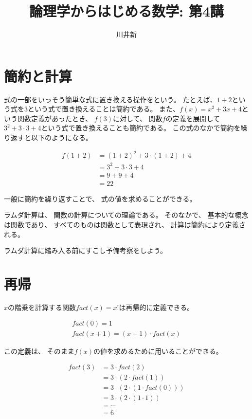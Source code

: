 \documentclass[fleqn]{jsarticle}
\title{論理学からはじめる数学: 第4講}
\author{川井新}
\begin{document}
\maketitle

\section{簡約と計算}

式の一部をいっそう簡単な式に置き換える操作をという。
たとえば、$1+2$という式を$3$という式で置き換えることは簡約である。
また、$f(x)=x^2+3x+4$という関数定義があったとき、
$f(3)$に対して、
関数$f$の定義を展開して$3^2+3 \cdot 3 +4$という式で置き換えることも簡約である。
この式のなかで簡約を繰り返すと以下のようになる。

\begin{align*}
  f(1+2) &= (1+2)^2 + 3 \cdot (1+2) + 4\\
         &= 3^2 + 3 \cdot 3 + 4\\
         &= 9 + 9 + 4\\
         &= 22
\end{align*}

一般に簡約を繰り返すことで、
式の値を求めることができる。

ラムダ計算は、
関数の計算についての理論である。
そのなかで、
基本的な概念は関数であり、
すべてのものは関数として表現され、
計算は簡約により定義される。

ラムダ計算に踏み入る前にすこし予備考察をしよう。

\section{再帰}

$x$の階乗を計算する関数$fact(x) = x!$は再帰的に定義できる。

\begin{gather*}
  fact(0) = 1\\
  fact(x+1) = (x+1) \cdot fact(x)
\end{gather*}

この定義は、
そのまま$f(x)$の値を求めるために用いることができる。

\begin{align*}
  fact(3) &= 3 \cdot fact(2)\\
          &= 3 \cdot (2 \cdot fact(1))\\
          &= 3 \cdot (2 \cdot (1 \cdot fact(0)))\\
          &= 3 \cdot (2 \cdot (1 \cdot 1))\\
          &= \cdots\\
          &= 6
\end{align*}
\end{document}
